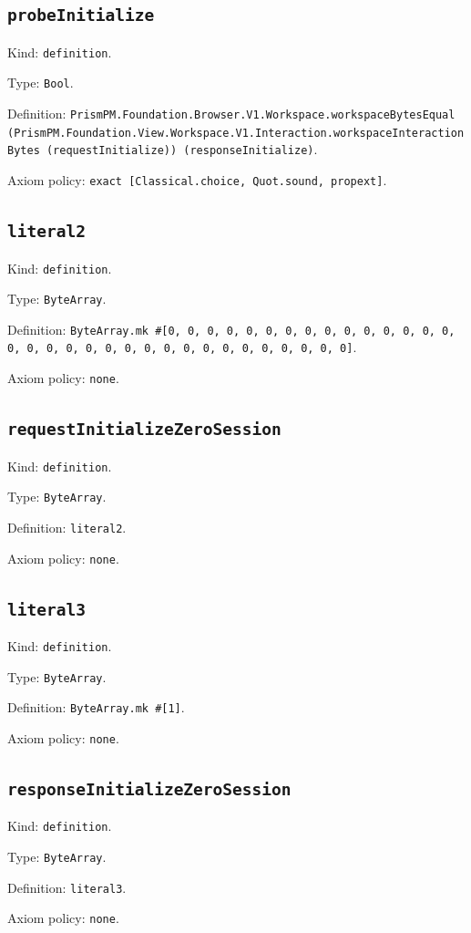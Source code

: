 \documentclass[11pt]{article}
\begin{document}
\subsection*{\texttt{probeInitialize}}
\noindent Kind: \texttt{definition}.\par
\noindent Type: \texttt{Bool}.\par
\noindent Definition: \texttt{PrismPM.Foundation.Browser.V1.Workspace.workspaceBytesEqual (PrismPM.Foundation.View.Workspace.V1.Interaction.workspaceInteractionBytes (requestInitialize)) (responseInitialize)}.\par
\noindent Axiom policy: \texttt{exact [Classical.choice, Quot.sound, propext]}.\par
\subsection*{\texttt{literal2}}
\noindent Kind: \texttt{definition}.\par
\noindent Type: \texttt{ByteArray}.\par
\noindent Definition: \texttt{ByteArray.mk \#[0, 0, 0, 0, 0, 0, 0, 0, 0, 0, 0, 0, 0, 0, 0, 0, 0, 0, 0, 0, 0, 0, 0, 0, 0, 0, 0, 0, 0, 0, 0, 0, 0]}.\par
\noindent Axiom policy: \texttt{none}.\par
\subsection*{\texttt{requestInitializeZeroSession}}
\noindent Kind: \texttt{definition}.\par
\noindent Type: \texttt{ByteArray}.\par
\noindent Definition: \texttt{literal2}.\par
\noindent Axiom policy: \texttt{none}.\par
\subsection*{\texttt{literal3}}
\noindent Kind: \texttt{definition}.\par
\noindent Type: \texttt{ByteArray}.\par
\noindent Definition: \texttt{ByteArray.mk \#[1]}.\par
\noindent Axiom policy: \texttt{none}.\par
\subsection*{\texttt{responseInitializeZeroSession}}
\noindent Kind: \texttt{definition}.\par
\noindent Type: \texttt{ByteArray}.\par
\noindent Definition: \texttt{literal3}.\par
\noindent Axiom policy: \texttt{none}.\par
\end{document}
